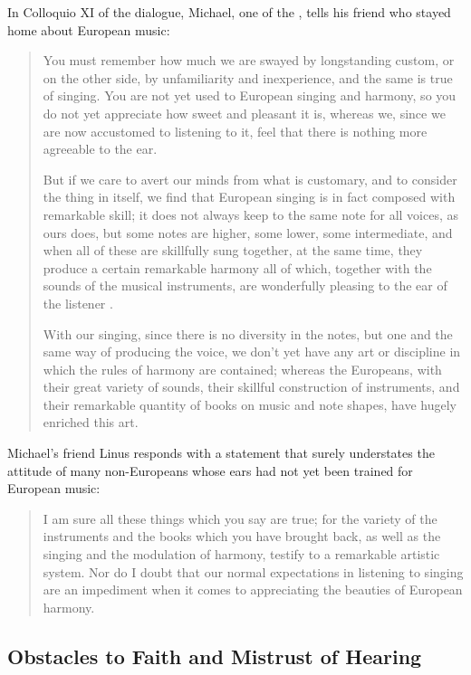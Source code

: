 In Colloquio XI of the dialogue, Michael, one of the , tells
his friend who stayed home about European music:
\begin{quotation}
    You must remember \Dots{} how much we are swayed by longstanding custom, or
    on the other side, by unfamiliarity and inexperience, and the same is true
    of singing.
    You are not yet used to European singing and harmony, so you do not yet
    appreciate how sweet and pleasant it is, whereas we, since we are now
    accustomed to listening to it, feel that there is nothing more agreeable to
    the ear.

    But if we care to avert our minds from what is customary, and to consider
    the thing in itself, we find that European singing is in fact composed with
    remarkable skill; it does not always keep to the same note for all voices,
    as ours does, but some notes are higher, some lower, some intermediate, and
    when all of these are skillfully sung together, at the same time, they
    produce a certain remarkable harmony \Dots{} all of which, \Dots{} together
    with the sounds of the musical instruments, are wonderfully pleasing to the
    ear of the listener \Dots{}.

    With our singing, since there is no diversity in the notes, but one and the
    same way of producing the voice, we don't yet have any art or discipline in
    which the rules of harmony are contained; whereas the Europeans, with their
    great variety of sounds, their skillful construction of instruments, and
    their remarkable quantity of books on music and note shapes, have hugely
    enriched this art.%
        \Autocite[155-156]{Massarella:JapaneseTravellers}
\end{quotation}
Michael's friend Linus responds with a statement that surely understates the
attitude of many non-Europeans whose ears had not yet been trained for European
music:
\begin{quote}
    I am sure all these things which you say are true; for the variety of the
    instruments and the books which you have brought back, as well as the
    singing and the modulation of harmony, testify to a remarkable artistic
    system.
    Nor do I doubt that our normal expectations in listening to singing are an
    impediment when it comes to appreciating the beauties of European harmony.%
        \Autocite[156]{Massarella:JapaneseTravellers}
\end{quote}


\subsection{Obstacles to Faith and Mistrust of Hearing}

